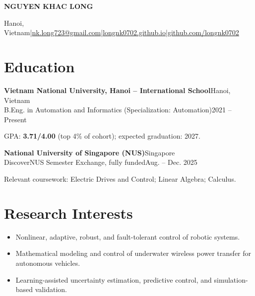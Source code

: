 \documentclass[11pt,a4paper]{article}
\newcommand{\inst}[3]{%
  \par\needspace{3\baselineskip}\noindent\hspace*{0.22cm}\textbf{#1}\hfill #2\\[-1pt]
  \hspace*{0.22cm}#3\par}
\newenvironment{compactbullets}{\begin{itemize}[leftmargin=0.81cm,topsep=2pt,itemsep=2.5pt,parsep=0pt,partopsep=0pt,label=\textbullet]}{\end{itemize}}
\begin{document}
\begin{center}
{\fontsize{19.5pt}{23pt}\selectfont\bfseries NGUYEN KHAC LONG}\par\vspace{6pt}
{\small Hanoi, Vietnam\quad|\quad \href{mailto:nk.long723@gmail.com}{nk.long723@gmail.com}\quad|\quad \href{https://longnk0702.github.io}{longnk0702.github.io}\quad|\quad \href{https://github.com/longnk0702}{github.com/longnk0702}}\par
\end{center}
\vspace{1pt}

\section{Education}
\inst{Vietnam National University, Hanoi -- International School}{Hanoi, Vietnam}{B.Eng. in Automation and Informatics (Specialization: Automation)\hfill 2021 -- Present}
\hspace*{0.22cm}GPA: \textbf{3.71/4.00} (top 4\% of cohort); expected graduation: 2027.\par\vspace{5pt}
\inst{National University of Singapore (NUS)}{Singapore}{DiscoverNUS Semester Exchange, fully funded\hfill Aug. -- Dec. 2025}
\hspace*{0.22cm}Relevant coursework: Electric Drives and Control; Linear Algebra; Calculus.\par

\section{Research Interests}
\begin{compactbullets}
\item Nonlinear, adaptive, robust, and fault-tolerant control of robotic systems.
\item Mathematical modeling and control of underwater wireless power transfer for autonomous vehicles.
\item Learning-assisted uncertainty estimation, predictive control, and simulation-based validation.
\end{compactbullets}
\end{document}
